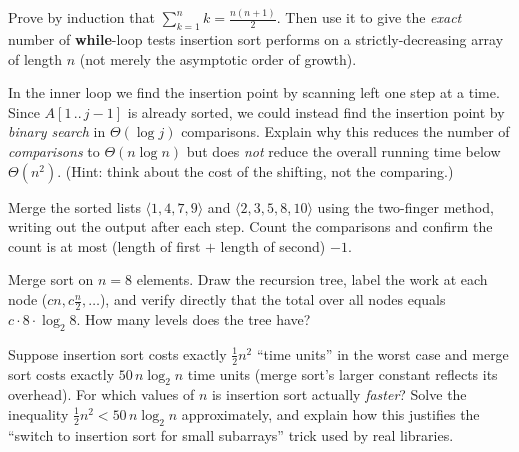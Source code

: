 \begin{exercise}
Prove by induction that $\sum_{k=1}^{n} k = \frac{n(n+1)}{2}$. Then use it to give the
\emph{exact} number of \textbf{while}-loop tests insertion sort performs on a
strictly-decreasing array of length $n$ (not merely the asymptotic order of growth).
\end{exercise}

\begin{exercise}
In the inner loop we find the insertion point by scanning left one step at a time. Since
$A[1\,..\,j-1]$ is already sorted, we could instead find the insertion point by
\emph{binary search} in $\Theta(\log j)$ comparisons. Explain why this reduces the
number of \emph{comparisons} to $\Theta(n \log n)$ but does \emph{not} reduce the
overall running time below $\Theta(n^2)$. (Hint: think about the cost of the shifting,
not the comparing.)
\end{exercise}

\begin{exercise}
Merge the sorted lists $\langle 1, 4, 7, 9 \rangle$ and $\langle 2, 3, 5, 8, 10 \rangle$
using the two-finger method, writing out the output after each step. Count the
comparisons and confirm the count is at most (length of first $+$ length of second)
$- 1$.
\end{exercise}

\begin{exercise}
Merge sort on $n = 8$ elements. Draw the recursion tree, label the work at each node
($cn, c\frac{n}{2}, \dots$), and verify directly that the total over all nodes equals
$c \cdot 8 \cdot \log_2 8$. How many levels does the tree have?
\end{exercise}

\begin{exercise}
Suppose insertion sort costs exactly $\frac{1}{2} n^2$ ``time units'' in the worst case
and merge sort costs exactly $50\, n \log_2 n$ time units (merge sort's larger constant
reflects its overhead). For which values of $n$ is insertion sort actually \emph{faster}?
Solve the inequality $\frac{1}{2} n^2 < 50\, n \log_2 n$ approximately, and explain how
this justifies the ``switch to insertion sort for small subarrays'' trick used by real
libraries.
\end{exercise}
